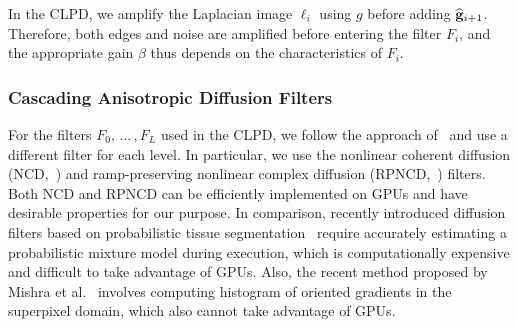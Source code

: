 In the CLPD, we amplify the Laplacian image \({\boldsymbol\ell}_i\) using \(g\) before adding \(\widehat{\mathbf{g}}_{i+1}\).
Therefore, both edges and noise are amplified before entering the filter \(F_i\), and the appropriate gain \(\beta\) thus depends on the characteristics of \(F_i\).

\subsubsection{Cascading Anisotropic Diffusion Filters}
For the filters \(F_0,\,\ldots\,, F_L\) used in the CLPD, we follow the approach of~\cite{kang_new_2016} and use a different filter for each level.
In particular, we use the nonlinear coherent diffusion (NCD,~\cite{abd-elmoniem_realtime_2002}) and ramp-preserving nonlinear complex diffusion (RPNCD,~\cite{gilboa_image_2004}) filters.
Both NCD and RPNCD can be efficiently implemented on GPUs and have desirable properties for our purpose.
In comparison, recently introduced diffusion filters based on probabilistic tissue segmentation~\cite{vegas-sanchez-ferrero_probabilisticdriven_2010, ramos-llorden_anisotropic_2015} require accurately estimating a probabilistic mixture model during execution, which is computationally expensive and difficult to take advantage of GPUs.
Also, the recent method proposed by Mishra et al.~\cite{mishra_edge_2018} involves computing histogram of oriented gradients in the superpixel domain, which also cannot take advantage of GPUs.
%

